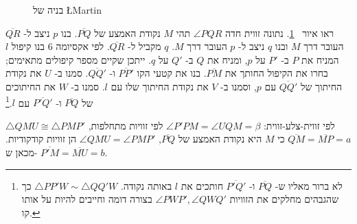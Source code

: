 \begin{figure}
\begin{center}
\end{center}
\caption{בניה של \L{Martin}}\label{f.martin}
\end{figure}

ראו איור~%
\ref{f.martin}.
נתונה זווית חדה
$\angle PQR$
תהי
$M$
נקודת האמצע של
$\overline{PQ}$.
בנו
$p$
ניצב ל-%
$\overline{QR}$
העובר דרך
$M$
ובנו
$q$
ניצב ל-%
$p$
העובר דרך 
$M$.
$q$
מקביל ל-%
$\overline{QR}$.
לפי אקסיומה $6$ בנו קיפול
$l$
המניח את
$P$
ב-%
$P'$
על
$p$,
ומניח את
$Q$
ב-%
$Q'$
על
$q$.
ייתכן שקיים מספר קיפולים מתאימים; בחרו את הקיפול החותך את
$\overline{PM}$.
בנו את קטעי הקו
$\overline{PP'}$
ו-%
$\overline{QQ'}$.
סמנו ב-%
$U$
את נקודת החיתוך של
$\overline{QQ'}$
עם
$p$,
וסמנו ב-%
$V$
את נקודת החיתוך שלו עם
$l$.
סמנו ב-%
$W$
את החיתוכים של 
$\overline{PQ}$
ו-%
$\overline{P'Q'}$
עם
$l$.\footnote{%
לא ברור מאליו ש-%
$\overline{PQ}$
ו-%
$\overline{P'Q'}$
חותכים את
$l$
באותה נקודה. 
$\triangle PP'W\sim\triangle QQ'W$
כך שהגבהים מחלקים את הזוויות 
$\angle PWP', \angle QWQ'$
בצורה דומה וחייבים להיות על אותו קו.%
}


$\triangle QMU\cong \triangle PMP'$
לפי זווית-צלע-זווית:
$\angle P'PM=\angle UQM=\beta$
לפי זוויות מתחלפות,
$\overline{QM}=\overline{MP}=a$
כי 
$M$
היא נקודת האמצע של
$\overline{PQ}$,
$\angle QMU=\angle PMP'$
הן זוויות קודקודיות. מכאן ש-%
$\overline{P'M}=\overline{MU}=b$.

